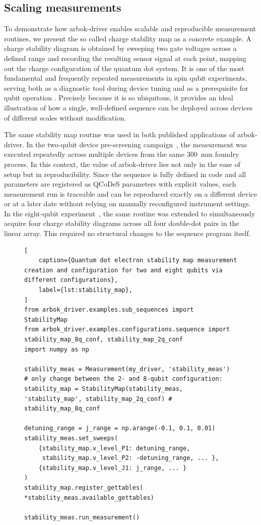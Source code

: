 \documentclass[numbers, preprint, twocolumn,10pt]{elsarticle}
\begin{document}
\subsection{Scaling measurements}
\noindent
To demonstrate how arbok-driver enables scalable and reproducible measurement routines, we present the so called charge stability map as a concrete example.
A charge stability diagram is obtained by sweeping two gate voltages across a defined range and recording the resulting sensor signal at each point, mapping out the charge configuration of the quantum dot system.
It is one of the most fundamental and frequently repeated measurements in spin qubit experiments, serving both as a diagnostic tool during device tuning and as a prerequisite for qubit operation \cite{nickl_eight-qubit_2025, steinacker_industry-compatible_2025, jones_mid-circuit_2026}.
Precisely because it is so ubiquitous, it provides an ideal illustration of how a single, well-defined sequence can be deployed across devices of different scales without modification.

The same stability map routine was used in both published applications of arbok-driver.
In the two-qubit device pre-screening campaign~\cite{steinacker_industry-compatible_2025}, the measurement was executed repeatedly across multiple devices from the same \SI{300}{\milli\meter} foundry process.
In this context, the value of arbok-driver lies not only in the ease of setup but in reproducibility.  Since the sequence is fully defined in code and all parameters are registered as QCoDeS parameters with explicit values, each measurement run is traceable and can be reproduced exactly on a different device or at a later date without relying on manually reconfigured instrument settings.
In the eight-qubit experiment~\cite{nickl_eight-qubit_2025}, the same routine was extended to simultaneously acquire four charge stability diagrams across all four double-dot pairs in the linear array. This required no structural changes to the sequence program itself.

\begin{figure}[]
\begin{lstlisting}[
    caption={Quantum dot electron stability map measurement creation and configuration for two and eight qubits via different configurations},
    label={lst:stability_map},
]
from arbok_driver.examples.sub_sequences import StabilityMap
from arbok_driver.examples.configurations.sequence import stability_map_8q_conf, stability_map_2q_conf
import numpy as np

stability_meas = Measurement(my_driver, 'stability_meas')
# only change between the 2- and 8-qubit configuration:
stability_map = StabilityMap(stability_meas, 'stability_map', stability_map_2q_conf) # stability_map_8q_conf

detuning_range = j_range = np.arange(-0.1, 0.1, 0.01)
stability_meas.set_sweeps(
    {stability_map.v_level_P1: detuning_range,
     stability_map.v_level_P2: -detuning_range, ... },
    {stability_map.v_level_J1: j_range, ... }
)
stability_map.register_gettables( *stability_meas.available_gettables)

stability_meas.run_measurement()
\end{lstlisting}
\end{figure}
\end{document}
